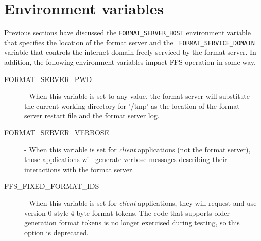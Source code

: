 \documentclass{article}
\begin{document}
\section{Environment variables}
Previous sections have discussed the {\tt FORMAT\_SERVER\_HOST} environment
variable that specifies the location of the format server and the {\tt
FORMAT\_SERVICE\_DOMAIN} variable that controls the internet domain freely
serviced by the format server.  In addition, the following environment
variables impact FFS operation in some way.
\begin{description}
\item[FORMAT\_SERVER\_PWD] - When this variable is set to any value, the
format server will substitute the current working directory for '/tmp' as
the location of the format server restart file and the format server log.
\item[FORMAT\_SERVER\_VERBOSE] - When this variable is set for {\it client}
applications (not the format server), those applications will generate
verbose messages describing their interactions with the format server.
\item[FFS\_FIXED\_FORMAT\_IDS] - When this variable is set for {\it client}
applications, they will request and use version-0-style 4-byte format
tokens.  The code that supports older-generation format tokens is no longer
exercised during testing, so this option is deprecated.
\end{description}
\end{document}
